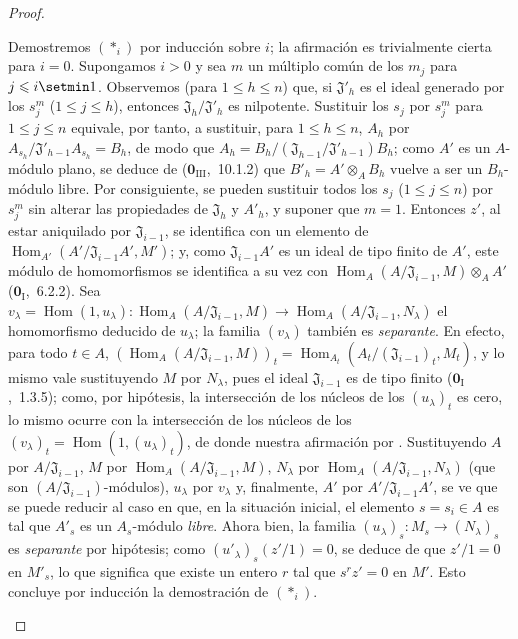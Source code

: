 \begin{proof}
\begin{enumerate}[label=(\roman*)]
  Demostremos $(*_i)$ por inducción sobre $i$; la afirmación es trivialmente cierta para $i=0$.
  Supongamos $i>0$ y sea $m$ un múltiplo común de los $m_j$ para $j\leq i\setmin 1$.
  Observemos (para $1\leq h\leq n$) que, si $\mathfrak J'_h$ es el ideal generado por los $s_j^m$ ($1\leq j\leq h$), entonces $\mathfrak J_h/\mathfrak J'_h$ es nilpotente.
  Sustituir los $s_j$ por $s_j^m$ para $1\leq j\leq n$ equivale, por tanto, a sustituir, para $1\leq h\leq n$, $A_h$ por
  $A_{s_h}/\mathfrak J'_{h-1}A_{s_h}=B_h$, de modo que
  $A_h=B_h/(\mathfrak J_{h-1}/\mathfrak J'_{h-1})B_h$; como $A'$ es un $A$-módulo plano, se deduce de ($\mathbf{0}_{\mathrm{III}}$,~10.1.2) que $B'_h=A'\otimes_A B_h$ vuelve a ser un $B_h$-módulo libre.
  Por consiguiente, se pueden
  sustituir todos los $s_j$ ($1\leq j\leq n$) por $s_j^m$ sin alterar las propiedades de $\mathfrak J_h$ y $A'_h$, y suponer que $m=1$.
  Entonces $z'$, al estar aniquilado por $\mathfrak J_{i-1}$, se identifica con un elemento de $\operatorname{Hom}_{A'}(A'/\mathfrak J_{i-1}A',M')$; y, como $\mathfrak J_{i-1}A'$ es un ideal de tipo finito de $A'$, este módulo de homomorfismos se identifica a su vez con $\operatorname{Hom}_A(A/\mathfrak J_{i-1},M)\otimes_A A'$ ($\mathbf{0}_{\mathrm{I}}$,~6.2.2).
  Sea $v_\lambda=\operatorname{Hom}(1,u_\lambda):
  \operatorname{Hom}_A(A/\mathfrak J_{i-1},M)\longrightarrow
  \operatorname{Hom}_A(A/\mathfrak J_{i-1},N_\lambda)$ el homomorfismo deducido de $u_\lambda$; la familia $(v_\lambda)$ también es \emph{separante}.
  En efecto, para todo $t\in A$,
  $(\operatorname{Hom}_A(A/\mathfrak J_{i-1},M))_t
  =\operatorname{Hom}_{A_t}(A_t/(\mathfrak J_{i-1})_t,M_t)$,
  y lo mismo vale sustituyendo $M$ por $N_\lambda$, pues el ideal $\mathfrak J_{i-1}$ es de tipo finito ($\mathbf{0}_{\mathrm{I}}$,~1.3.5); como, por hipótesis, la intersección de los núcleos de los $(u_\lambda)_t$ es cero, lo mismo ocurre con la intersección de los núcleos de los $(v_\lambda)_t=\operatorname{Hom}(1,(u_\lambda)_t)$, de donde nuestra afirmación por .
  Sustituyendo $A$ por $A/\mathfrak J_{i-1}$, $M$ por $\operatorname{Hom}_A(A/\mathfrak J_{i-1},M)$, $N_\lambda$ por $\operatorname{Hom}_A(A/\mathfrak J_{i-1},N_\lambda)$ (que son $(A/\mathfrak J_{i-1})$-módulos), $u_\lambda$ por $v_\lambda$ y, finalmente, $A'$ por $A'/\mathfrak J_{i-1}A'$, se ve que se puede reducir al caso en que, en la situación inicial, el elemento $s=s_i\in A$ es tal que $A'_s$ es un $A_s$-módulo \emph{libre}.
  Ahora bien, la familia $(u_\lambda)_s:M_s\to(N_\lambda)_s$ es \emph{separante} por hipótesis; como $(u'_\lambda)_s(z'/1)=0$, se deduce de  que $z'/1=0$ en $M'_s$, lo que significa que existe un entero $r$ tal que $s^rz'=0$ en $M'$. Esto concluye por inducción la demostración de $(*_i)$.
\end{enumerate}
\end{proof}

